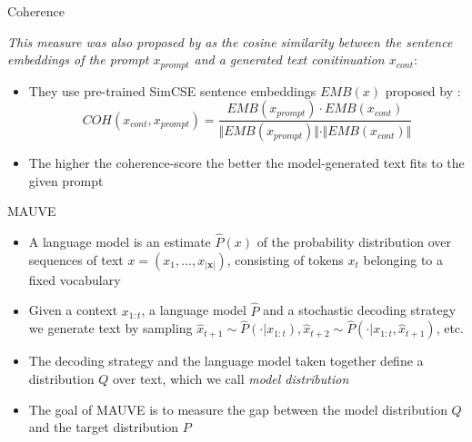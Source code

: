 
\begin{vbframe}{Coherence}

\textit{This measure was also proposed by  as the cosine similarity between the sentence embeddings of the prompt $x_{prompt}$ and a generated text conitinuation $x_{cont}$}:

\hspace{}

\begin{itemize}
    \item They use pre-trained SimCSE sentence embeddings $EMB(x)$ proposed by :
    $$COH(x_{cont}, x_{prompt}) = \frac{EMB(x_{prompt}) \cdot EMB(x_{cont})}{\Vert EMB(x_{prompt})\Vert \cdot \Vert EMB(x_{cont})\Vert}$$
    \item The higher the coherence-score the better the model-generated text fits to the given prompt
\end{itemize}
    
\end{vbframe}


\begin{vbframe}{MAUVE}

\vfill

\begin{itemize}
    \item A language model is an estimate $\hat{P}(x)$ of the probability distribution over sequences of text $x = (x_1, . . ., x_{|\mathbf{x}|})$, consisting of tokens $x_t$ belonging to a fixed vocabulary
    \item Given a context $x_{1:t}$, a language model $\hat{P}$ and a stochastic decoding strategy we generate text by sampling $\hat{x}_{t+1} \sim \hat{P}(\cdot|x_{1:t}), \hat{x}_{t+2} \sim \hat{P}(\cdot|x_{1:t}, \hat{x}_{t+1})$, etc.
    \item The decoding strategy and the language model taken together define a distribution $Q$ over text, which we call \textit{model distribution}
    \item The goal of MAUVE is to measure the gap between the model distribution $Q$ and the target distribution $P$
\end{itemize}

\vfill
    
\end{vbframe}

